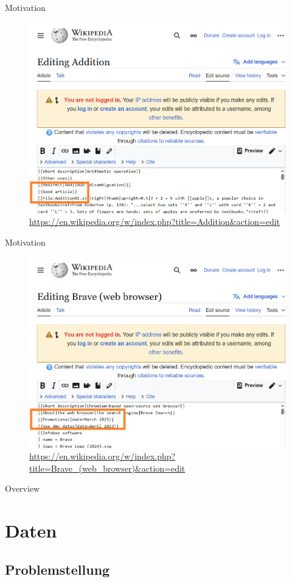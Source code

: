 \documentclass[aspectratio=169]{beamer} %
\begin{document}
\begin{frame}{Motivation}
    \begin{figure}
        \centering
        \includegraphics[width=0.6\linewidth]{figures/wp-screenshot-good-source.png}
        \caption{\url{https://en.wikipedia.org/w/index.php?title=Addition&action=edit}}
    \end{figure}
\end{frame}

\begin{frame}{Motivation}
    \begin{figure}
        \centering
        \includegraphics[width=0.6\linewidth]{figures/wp-screenshot-promo-source.png}
        \caption{\url{https://en.wikipedia.org/w/index.php?title=Brave_(web_browser)&action=edit}}
    \end{figure}
\end{frame}

\begin{frame}{Overview}
\tableofcontents
\end{frame}

\section{Daten}

\subsection{Problemstellung}
\end{document}
